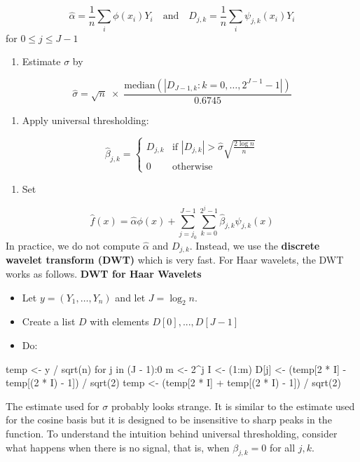 \[
\hat{\alpha} = \frac{1}{n} \sum_{i} \phi(x_{i}) Y_{i}
\quad \text{and} \quad
D_{j, k} = \frac{1}{n} \sum_{i} \psi_{j, k}(x_{i}) Y_{i}
\]
for \(0 \leq j \leq J - 1\)
\begin{enumerate}[tightlist,label={\arabic*.}]
\item
  Estimate \(\sigma\) by
\end{enumerate}
\[
\hat{\sigma} = \sqrt{n} \; \times \; \frac{\text{median} \left( \left| D_{J-1, k} : k = 0, \dots, 2^{J - 1} - 1\right| \right)}{0.6745}
\]
\begin{enumerate}[tightlist,label={\arabic*.},resume]
\item
  Apply universal thresholding:
\end{enumerate}
\[
\hat{\beta}_{j, k} = \begin{cases}
D_{j, k} & \text{if } \left| D_{j, k} \right| > \hat{\sigma} \sqrt{\frac{2 \log n}{n}} \\
0 & \text{otherwise}
\end{cases}
\]
\begin{enumerate}[tightlist,label={\arabic*.},resume]
\item
  Set
\end{enumerate}
\[
\hat{f}(x) = \hat{\alpha} \phi(x) + \sum_{j = j_{0}}^{J - 1} \sum_{k = 0}^{2^{j} - 1} \hat{\beta}_{j, k} \psi_{j, k}(x)
\]
In practice, we do not compute \(\hat{\alpha}\) and \(D_{j, k}\).
Instead, we use the \textbf{discrete wavelet transform (DWT)} which is
very fast. For Haar wavelets, the DWT works as follows.
\textbf{DWT for Haar Wavelets}
\begin{itemize}[tightlist]
\item
  Let \(y = (Y_{1}, \dots, Y_{n})\) and let \(J = \log_{2} n\).\\
\item
  Create a list \(D\) with elements \(D[0], ..., D[J - 1]\)
\item
  Do:
\end{itemize}
\begin{console}
temp <- y / sqrt(n)
for j in (J - 1):0 {
  m <- 2^{j}
  I <- (1:m)
  D[j] <- (temp[2 * I] - temp[(2 * I) - 1]) / sqrt(2)
  temp <- (temp[2 * I] + temp[(2 * I) - 1]) / sqrt(2)
}
\end{console}
The estimate used for \(\sigma\) probably looks strange. It is similar
to the estimate used for the cosine basis but it is designed to be
insensitive to sharp peaks in the function.
To understand the intuition behind universal thresholding, consider what
happens when there is no signal, that is, when \(\beta_{j, k} = 0\) for
all \(j, k\).

